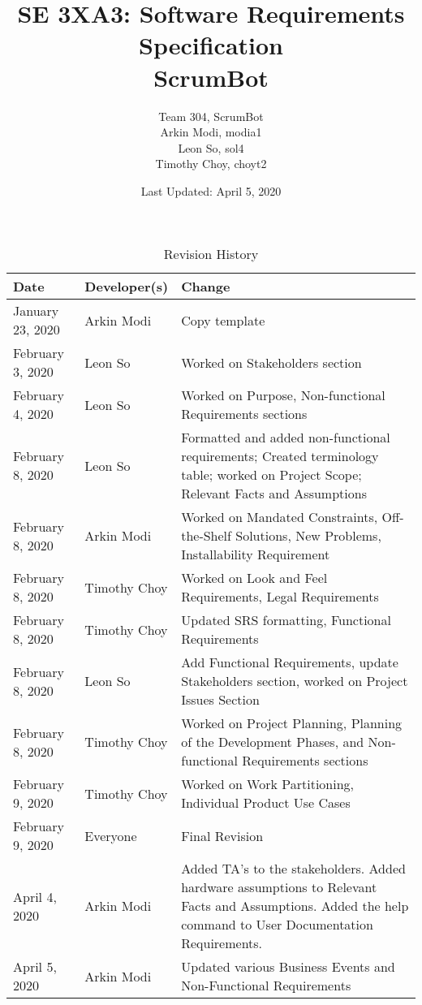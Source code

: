 \documentclass[12pt, titlepage]{article}
\title{SE 3XA3: Software Requirements Specification\\ScrumBot}
\author{
    Team 304, ScrumBot
        \\ Arkin Modi, modia1
        \\ Leon So, sol4
        \\ Timothy Choy, choyt2
}
\date{Last Updated: April 5, 2020}
\begin{document}
\maketitle

\tableofcontents
\listoftables
\listoffigures

\newpage

\begin{table}[!hbp]
    \caption{Revision History} \label{TblRevisionHistory}
    \begin{tabularx}{\textwidth}{llX}
        \toprule
            \textbf{Date} & \textbf{Developer(s)} & \textbf{Change}\\
        \midrule
            January 23, 2020 & Arkin Modi & Copy template\\
            February 3, 2020 & Leon So & Worked on Stakeholders section\\
            February 4, 2020 & Leon So & Worked on Purpose, Non-functional Requirements sections\\
            February 8, 2020 & Leon So & Formatted and added non-functional requirements; Created terminology table; worked on Project Scope; Relevant Facts and Assumptions\\
            February 8, 2020 & Arkin Modi & Worked on Mandated Constraints, Off-the-Shelf Solutions, New Problems, Installability Requirement\\
            February 8, 2020 & Timothy Choy & Worked on Look and Feel Requirements, Legal Requirements\\
            February 8, 2020 & Timothy Choy & Updated SRS formatting, Functional Requirements\\
            February 8, 2020 & Leon So & Add Functional Requirements, update Stakeholders section, worked on Project Issues Section\\
            February 8, 2020 & Timothy Choy & Worked on Project Planning, Planning of the Development Phases, and Non-functional Requirements sections\\
            February 9, 2020 & Timothy Choy & Worked on Work Partitioning, Individual Product Use Cases\\
            February 9, 2020 & Everyone & Final Revision\\
            April 4, 2020 & Arkin Modi & Added TA's to the stakeholders. Added hardware assumptions to Relevant Facts and Assumptions. Added the help command to User Documentation Requirements.\\
            April 5, 2020 & Arkin Modi & Updated various Business Events and Non-Functional Requirements\\
        \bottomrule
    \end{tabularx}
\end{table}
\end{document}
